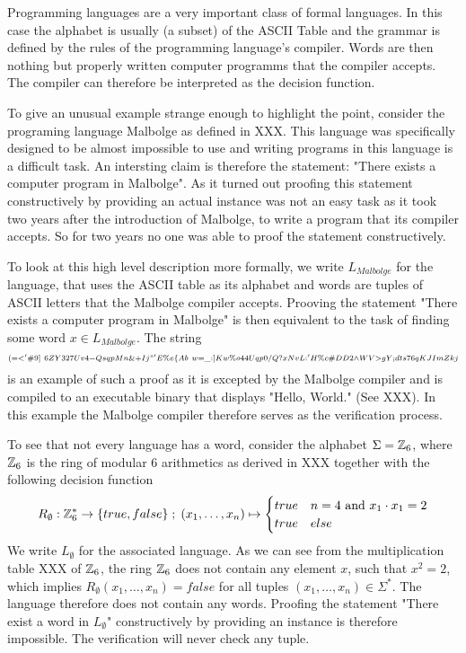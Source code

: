 \begin{example}Programming languages are a very important class of formal languages. In this case the alphabet is usually (a subset) of the ASCII Table and the grammar is defined by the rules of the programming language's compiler. Words are then nothing but properly written computer programms that the compiler accepts. The compiler can therefore be interpreted as the decision function.

To give an unusual example strange enough to highlight the point, consider the programing language Malbolge as defined in XXX. This language was specifically designed to be almost impossible to use and writing programs in this language is a difficult task. An intersting claim is therefore the statement: "There exists a computer program in Malbolge". As it turned out proofing this statement constructively by providing an actual instance was not an easy task as it took two years after the introduction of Malbolge, to write a program that its compiler accepts. So for two years no one was able to proof the statement constructively.

To look at this high level description more formally, we write $L_{Malbolge}$ for the language, that uses the ASCII table as its alphabet and words are tuples of ASCII letters that the Malbolge compiler accepts. Prooving the statement "There exists a computer program in Malbolge" is then equivalent to the task of finding some word $x\in L_{Malbolge}$. The string
$$
\scriptstyle (=<'\#9]~6ZY327Uv4-QsqpMn\&+Ij"'E\%e\{Ab~w=\_:]Kw\%o44Uqp0/Q?xNvL:'H\%c\#DD2\wedge WV>gY;dts76qKJImZkj
$$
is an example of such a proof as it is excepted by the Malbolge compiler and is compiled to an executable binary that displays "Hello, World." (See XXX). In this example the Malbolge compiler therefore serves as the verification process.
\end{example}
\begin{example} To see that not every language has a word, consider the alphabet $\Sigma = \mathbb{Z}_6$, where $\mathbb{Z}_6$ is the ring of modular $6$ arithmetics as derived in XXX together with the following decision function 
$$
R_{\emptyset} : \mathbb{Z}_{6}^* \to \{true, false\}\;;\;
(x_1,\ldots,x_n) \mapsto
\begin{cases}
true & n=4 \text{ and } x_1\cdot x_1 = 2\\
true & else
\end{cases}
$$
We write $L_\emptyset$ for the associated language. As we can see from the multiplication table XXX of $\mathbb{Z}_6$, the ring $\mathbb{Z}_6$ does not contain any element $x$, such that $x^2 =2$, which implies $R_{\emptyset}(x_1,\ldots,x_n)=false$ for all tuples $(x_1,\ldots,x_n)\in \Sigma^*$. The language therefore does not contain any words. Proofing the statement "There exist a word in $L_\emptyset$" constructively by providing an instance is therefore impossible. The verification will never check any tuple.
\end{example}
